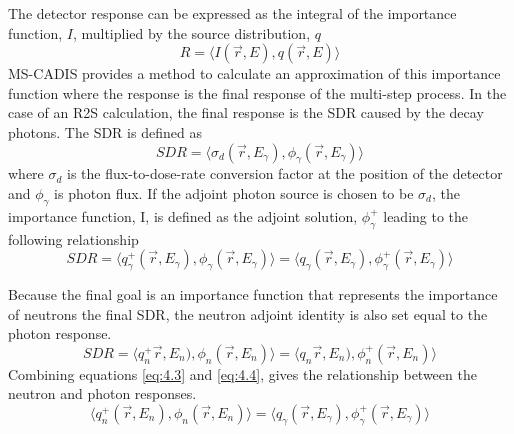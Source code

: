 The detector response can be
expressed as the integral of the importance function, $I$, multiplied by the source
distribution, $q$
\begin{equation} \label{eq:4.1}
R = %
    \langle I(\overrightarrow{r}, E), 
    q(\overrightarrow{r}, E) \rangle
\end{equation}
MS-CADIS provides a method to calculate an approximation of this importance function
where the response is the final response of the multi-step process.  In the case
of an R2S calculation, the final response is the SDR caused by the decay
photons.  The SDR is defined as 
\begin{equation} \label{eq:4.2}
  SDR =  \langle \sigma_{d}(\overrightarrow{r},E_{\gamma}),
  \phi_{\gamma}(\overrightarrow{r}, E_{\gamma}) \rangle
\end{equation}
where $\sigma_{d}$ is the flux-to-dose-rate conversion factor at the position of
the detector and $\phi_{\gamma}$ is photon flux.
If the adjoint photon
source is chosen to be $\sigma_d$, the importance function, I,
is defined as the adjoint solution, $\phi_{\gamma}^{+}$
leading to the following relationship
\begin{equation} \label{eq:4.3}
	SDR =  \langle q_{\gamma}^{+}(\overrightarrow{r},E_{\gamma}),
  \phi_{\gamma}(\overrightarrow{r}, E_{\gamma}) \rangle 
	= \langle q_{\gamma}(\overrightarrow{r},E_{\gamma}),
  \phi_{\gamma}^{+}(\overrightarrow{r}, E_{\gamma}) \rangle 
\end{equation}

Because the final goal is an importance function that represents the importance
of neutrons the final SDR, the
neutron adjoint identity is also set equal to the photon response.
\begin{equation} \label{eq:4.4}
  SDR =  \langle q_{n}^{+}\overrightarrow{r},E_{n}),
  \phi_{n}(\overrightarrow{r}, E_{n}) \rangle 
  = \langle q_{n}\overrightarrow{r},E_{n}),
  \phi_{n}^{+}(\overrightarrow{r}, E_{n}) \rangle 
\end{equation}
Combining equations \ref{eq:4.3} and \ref{eq:4.4}, 
gives the relationship between the neutron and photon responses.
\begin{equation} \label{eq:4.5}
	\langle q_{n}^{+}(\overrightarrow{r},E_{n}),
  \phi_{n}(\overrightarrow{r}, E_{n}) \rangle 
	= \langle q_{\gamma}(\overrightarrow{r},E_{\gamma}),
  \phi_{\gamma}^{+}(\overrightarrow{r}, E_{\gamma}) \rangle 
\end{equation}

